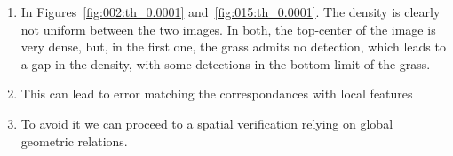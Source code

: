 \documentclass{article}
\begin{document}
\begin{enumerate}
	\item In Figures~\ref{fig:002:th_0.0001} and~\ref{fig:015:th_0.0001}. The density is clearly not uniform between the two images. In both, the top-center of the image is very dense, but, in the first one, the grass admits no detection, which leads to a gap in the density, with some detections in the bottom limit of the grass.
	\item This can lead to error matching the correspondances with local features
	\item To avoid it we can proceed to a spatial verification relying on global geometric relations.
\end{enumerate}
\end{document}

